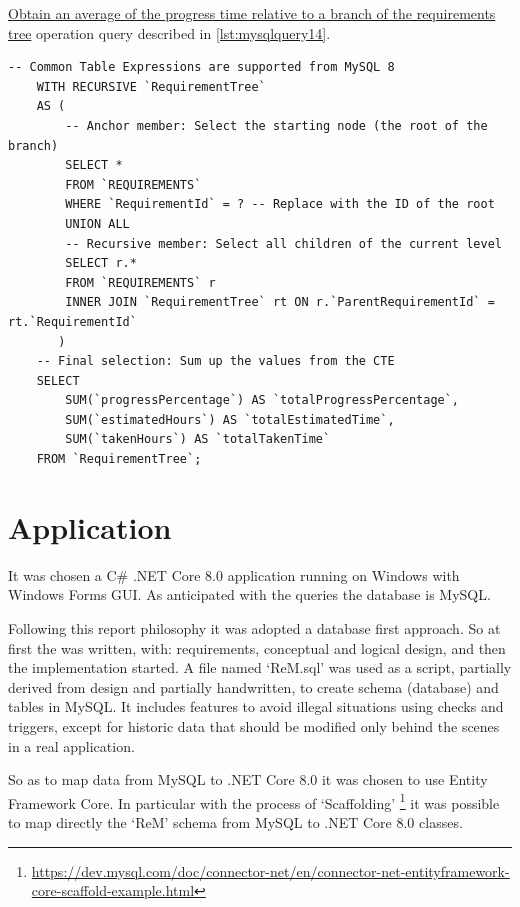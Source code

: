 \documentclass[12pt, a4paper]{report}
\begin{document}
\hyperref[subsubsec:op14]{Obtain an average of the progress time relative to a branch of the requirements tree} operation
query described in \autoref{lst:mysqlquery14}.

\begin{lstlisting}[language=MySQL, caption={\texorpdfstring{\hyperref[subsubsec:op14]{op. 14}}{op. 14}}, label={lst:mysqlquery14}]
    -- Common Table Expressions are supported from MySQL 8
    WITH RECURSIVE `RequirementTree`
    AS (
        -- Anchor member: Select the starting node (the root of the branch)
        SELECT *
        FROM `REQUIREMENTS`
        WHERE `RequirementId` = ? -- Replace with the ID of the root
        UNION ALL
        -- Recursive member: Select all children of the current level
        SELECT r.*
        FROM `REQUIREMENTS` r
        INNER JOIN `RequirementTree` rt ON r.`ParentRequirementId` = rt.`RequirementId`
       )
    -- Final selection: Sum up the values from the CTE
    SELECT
        SUM(`progressPercentage`) AS `totalProgressPercentage`,
        SUM(`estimatedHours`) AS `totalEstimatedTime`,
        SUM(`takenHours`) AS `totalTakenTime`
    FROM `RequirementTree`;
\end{lstlisting}

\section*{Application}

It was chosen a C\# .NET Core 8.0 application running on Windows with Windows Forms GUI.
As anticipated with the queries the database is MySQL.

Following this report philosophy it was adopted a database first approach.
So at first the  was written, with: requirements, conceptual and logical design, and then the
implementation started.
A file named `ReM.sql' was used as a script, partially derived from design and partially handwritten, to create schema (database)
and tables in MySQL. It includes features to avoid illegal situations using checks and triggers, except for historic data that
should be modified only behind the scenes in a real application.

So as to map data from MySQL to .NET Core 8.0 it was chosen to use Entity Framework Core.
In particular with the process of `Scaffolding'
\footnote{\url{https://dev.mysql.com/doc/connector-net/en/connector-net-entityframework-core-scaffold-example.html}}
it was possible to map directly the `ReM' schema from MySQL to .NET Core 8.0 classes.


\end{document}
